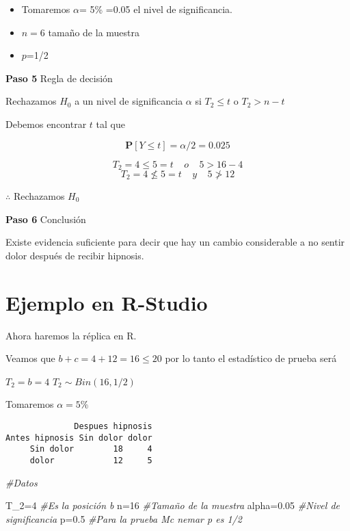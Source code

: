 \documentclass[
  a4paper,
  oneside,
  openany]{book}
\newenvironment{Shaded}{\begin{snugshade}}{\end{snugshade}}
\newcommand{\CommentTok}[1]{\textcolor[rgb]{0.56,0.35,0.01}{\textit{#1}}}
\newcommand{\DecValTok}[1]{\textcolor[rgb]{0.00,0.00,0.81}{#1}}
\newcommand{\FloatTok}[1]{\textcolor[rgb]{0.00,0.00,0.81}{#1}}
\newcommand{\NormalTok}[1]{#1}
\newcommand{\OtherTok}[1]{\textcolor[rgb]{0.56,0.35,0.01}{#1}}
\begin{document}
\begin{itemize}
\item
  Tomaremos \(\alpha\)= 5\% =0.05 el nivel de significancia.
\item
  \(n=6\) tamaño de la muestra
\item
  \(p\)=1/2
\end{itemize}

\textbf{Paso 5} Regla de decisión

Rechazamos \(H_0\) a un nivel de significancia \(\alpha\) si \(T_{2} \leq t\) o \(T_{2}>n-t\)

Debemos encontrar \(t\) tal que

\[\mathbf{P}[Y \leq t]=\alpha/2=0.025\]

\[T_{2}=4 \leq 5=t  \ \ \ \ \   o  \ \ \ \ \      5>16-4  \]
\[T_{2}=4 \nleq 5=t   \ \ \ \ \   y   \ \ \ \ \      5\ngtr12\]

\(\therefore\) Rechazamos \(H_0\)

\textbf{Paso 6} Conclusión

Existe evidencia suficiente para decir que hay un cambio considerable a no sentir dolor después de recibir hipnosis.

\hypertarget{ejemplo-en-r-studio-3}{%
\section{Ejemplo en R-Studio}\label{ejemplo-en-r-studio-3}}

Ahora haremos la réplica en R.

Veamos que \(b+c=4+12=16\leq 20\) por lo tanto el estadístico de prueba será

\(T_2=b=4\)
\(T_2\sim Bin(16,1/2)\)

Tomaremos \(\alpha=5\%\)

\begin{verbatim}
              Despues hipnosis
Antes hipnosis Sin dolor dolor
     Sin dolor        18     4
     dolor            12     5
\end{verbatim}

\begin{Shaded}
\begin{Highlighting}[]
\CommentTok{\#Datos}

\NormalTok{T\_2}\OtherTok{=}\DecValTok{4}                    \CommentTok{\#Es la posición b}
\NormalTok{n}\OtherTok{=}\DecValTok{16}                     \CommentTok{\#Tamaño de la muestra}
\NormalTok{alpha}\OtherTok{=}\FloatTok{0.05}               \CommentTok{\#Nivel de significancia}
\NormalTok{p}\OtherTok{=}\FloatTok{0.5}                    \CommentTok{\#Para la prueba Mc nemar p es 1/2}
\end{Highlighting}
\end{Shaded}
\end{document}
